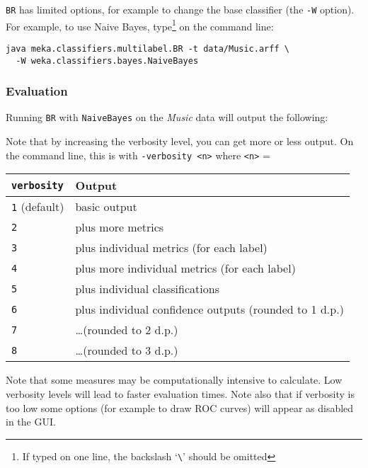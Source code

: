 \documentclass[11pt]{article}
\begin{document}
\texttt{BR} has limited options, for example to change the base classifier (the \texttt{-W} option). For example, to use Naive Bayes, type\footnote{If typed on one line, the backslash `\texttt{\textbackslash}' should be omitted} on the command line:

\begin{lstlisting}
java meka.classifiers.multilabel.BR -t data/Music.arff \
  -W weka.classifiers.bayes.NaiveBayes
\end{lstlisting}

\subsubsection{\label{sec:evaluation}Evaluation}

Running \texttt{BR} with \texttt{NaiveBayes} on the \textit{Music} data will output the following:

%
\begin{center}
%

\end{center}

Note that by increasing the verbosity level, you can get more or less output. On the command line, this is with \texttt{-verbosity <n>} where \texttt{<n>} = 
\begin{center}
\begin{tabular}{ll}
	\hline
	\texttt{verbosity}       & Output \\
	\hline
	\texttt{1} (default) & basic output \\
	\texttt{2}           & plus more metrics \\
	\texttt{3}           & plus individual metrics (for each label) \\
	\texttt{4}           & plus more individual metrics (for each label) \\
	\texttt{5}           & plus individual classifications \\
	\texttt{6}           & plus individual confidence outputs (rounded to 1 d.p.) \\
	\texttt{7}           & \ldots (rounded to 2 d.p.) \\
	\texttt{8}           & \ldots (rounded to 3 d.p.) \\
	\hline
\end{tabular}
\end{center}
Note that some measures may be computationally intensive to calculate. Low verbosity levels will lead to faster evaluation times. Note also that if verbosity is too low some options (for example to draw ROC curves) will appear as disabled in the GUI.
\end{document}
